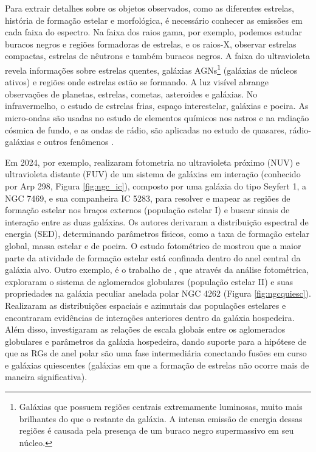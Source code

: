 Para extrair detalhes sobre os objetos observados, como as diferentes estrelas, história de formação estelar e morfológica, é necessário conhecer as emissões em cada faixa do espectro. Na faixa dos raios gama, por exemplo, podemos estudar buracos negros e regiões formadoras de estrelas, e os raios-X, observar estrelas compactas, estrelas de nêutrons e também buracos negros. A faixa do ultravioleta revela informações sobre estrelas quentes, galáxias AGNs\footnote{Galáxias que possuem regiões centrais extremamente luminosas, muito mais brilhantes do que o restante da galáxia. A intensa emissão de energia dessas regiões é causada pela presença de um buraco negro supermassivo em seu núcleo.} (galáxias de núcleos ativos) e regiões onde estrelas estão se formando. A luz visível abrange observações de planetas, estrelas, cometas, asteroides e galáxias. No infravermelho, o estudo de estrelas frias, espaço interestelar, galáxias e poeira. As micro-ondas são usadas no estudo de elementos químicos nos astros e na radiação cósmica de fundo, e as ondas de rádio, são aplicadas no estudo de quasares, rádio-galáxias e outros fenômenos \cite{2023Kepler,2022gastao}.

Em 2024, por exemplo,  realizaram fotometria no ultravioleta próximo (NUV) e ultravioleta distante (FUV) de um sistema de galáxias em interação (conhecido por Arp 298, Figura \ref{fig:ngc_ic}), composto por uma galáxia do tipo Seyfert 1, a NGC 7469, e sua companheira IC 5283, para resolver e mapear as regiões de formação estelar nos braços externos (população estelar I) e buscar sinais de interação entre as duas galáxias. Os autores derivaram a distribuição espectral de energia (SED), determinando parâmetros físicos, como a taxa de formação estelar global, massa estelar e de poeira. O estudo fotométrico de mostrou que a maior parte da atividade de formação estelar está confinada dentro do anel central da galáxia alvo. Outro exemplo, é o trabalho de , que através da análise fotométrica, exploraram o sistema de aglomerados globulares (população estelar II) e suas propriedades na galáxia peculiar anelada polar NGC 4262 (Figura \ref{fig:ngcquiesc}). Realizaram as distribuições espaciais e azimutais das populações estelares e encontraram evidências de interações anteriores dentro da galáxia hospedeira. Além disso, investigaram as relações de escala globais entre os aglomerados globulares e parâmetros da galáxia hospedeira, dando suporte para a hipótese de que as RGs de anel polar são uma fase intermediária conectando fusões em curso e galáxias quiescentes (galáxias em que a formação de estrelas não ocorre mais de maneira significativa).

